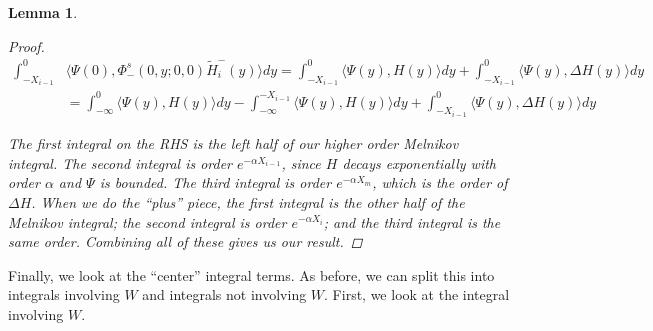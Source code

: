 \documentclass[12pt]{article}
\newtheorem{lemma}{Lemma}
\begin{document}
\begin{lemma}
\begin{proof}
\begin{align*}
\int_{-X_{i-1}}^0 &\langle \Psi(0), \Phi^s_-(0, y; 0, 0) \tilde{H}_i^-(y) \rangle dy = 
\int_{-X_{i-1}}^0 \langle \Psi(y), H(y) \rangle dy + \int_{-X_{i-1}}^0 \langle \Psi(y), \Delta H(y) \rangle dy \\
&= \int_{-\infty}^0 \langle \Psi(y), H(y) \rangle dy - \int_{-\infty}^{-X_{i-1}} \langle \Psi(y), H(y) \rangle dy + \int_{-X_{i-1}}^0 \langle \Psi(y), \Delta H(y) \rangle dy 
\end{align*}

The first integral on the RHS is the left half of our higher order Melnikov integral. The second integral is order $e^{-\alpha X_{i-1}}$, since $H$ decays exponentially with order $\alpha$ and $\Psi$ is bounded. The third integral is order $e^{-\alpha X_m}$, which is the order of $\Delta H$. When we do the ``plus'' piece, the first integral is the other half of the Melnikov integral; the second integral is order $e^{-\alpha X_i}$; and the third integral is the same order. Combining all of these gives us our  result.

\end{proof}
\end{lemma}

Finally, we look at the ``center'' integral terms. As before, we can split this into integrals involving $W$ and integrals not involving $W$. First, we look at the integral involving $W$.

\end{document}
